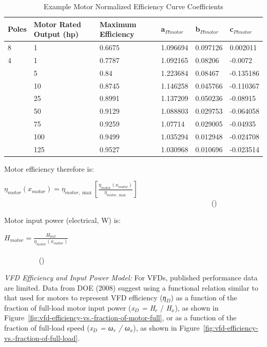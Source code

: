 \begin{longtable}[c]{p{1.0in}p{1.0in}p{1.0in}p{1.0in}p{1.0in}p{1.0in}}
\caption{Example Motor Normalized Efficiency Curve Coefficients \protect \label{table:example-motor-normalized-efficiency-curve}}\\
\toprule 
Poles & Motor Rated Output (hp) & Maximum Efficiency & a\(_{Plmotor}\) & b\(_{Plmotor}\) & c\(_{Plmotor}\) \tabularnewline \midrule
\endhead
8 & 1 & 0.6675 & 1.096694 & 0.097126 & 0.002011 \tabularnewline
4 & 1 & 0.7787 & 1.092165 & 0.08206 & -0.0072 \tabularnewline
 & 5 & 0.84 & 1.223684 & 0.08467 & -0.135186 \tabularnewline
 & 10 & 0.8745 & 1.146258 & 0.045766 & -0.110367 \tabularnewline
 & 25 & 0.8991 & 1.137209 & 0.050236 & -0.08915 \tabularnewline
 & 50 & 0.9129 & 1.088803 & 0.029753 & -0.064058 \tabularnewline
 & 75 & 0.9259 & 1.07714 & 0.029005 & -0.04935 \tabularnewline
 & 100 & 0.9499 & 1.035294 & 0.012948 & -0.024708 \tabularnewline
 & 125 & 0.9527 & 1.030968 & 0.010696 & -0.023514 \tabularnewline
\bottomrule
\end{longtable}

Motor efficiency therefore is:

\({\eta_{motor}}({x_{motor}}) = {\eta_{motor,\max }}\left[ {\frac{{{\eta_{motor}}({x_{motor}})}}{{{\eta_{motor,\max }}}}} \right]\) ~~~~~~~~~~~~~~~~~~~~~~~~~~~~~~~~~~~~~~~~~~~~~~~~~~~~~~~~~ ()

Motor input power (electrical, W) is:

\({H_{motor}} = \frac{{{H_{belt}}}}{{{\eta_{motor}}({x_{motor}})}}\) ~~~~~~~~~~~~~~~~~~~~~~~~~~~~~~~~~~~~~~~~~~~~~~~~~~~~~~~~~~~~~~~~~~~~~~~~~~~~~~~~~ ()

\emph{VFD Efficiency and Input Power Model:} For VFDs, published performance data are limited. Data from DOE (2008) suggest using a functional relation similar to that used for motors to represent VFD efficiency (\emph{η\(_{D}\)}) as a function of the fraction of full-load motor input power (\emph{x\(_{D}\) = H\(_{r}\)} / \emph{H\(_{x}\)}), as shown in Figure~\ref{fig:vfd-efficiency-vs.-fraction-of-motor-full}, or as a function of the fraction of full-load speed (\emph{x\(_{D}\) = ω\(_{r}\) / ω\(_{x}\)}), as shown in Figure~\ref{fig:vfd-efficiency-vs.-fraction-of-full-load}.

